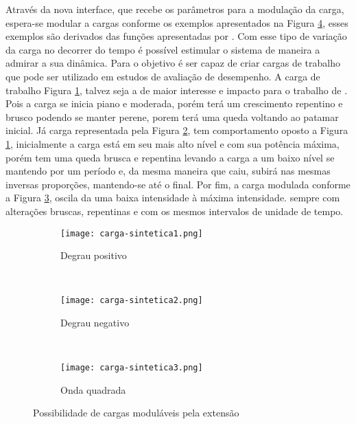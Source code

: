 Através da nova interface, que recebe os parâmetros para a modulação da carga, espera-se modular a cargas conforme os exemplos apresentados na Figura	\ref{fig:cargas-moduladas-exemplos}, esses exemplos são derivados das funções apresentadas por . Com esse tipo de variação da carga no decorrer do tempo é possível estimular o sistema de maneira a admirar a sua dinâmica.  Para  o objetivo é ser capaz de criar cargas de trabalho que pode ser utilizado em estudos de avaliação de desempenho. 
A carga de trabalho Figura \ref{fig:degrau-positivo}, talvez seja a de maior interesse e impacto para o trabalho de . Pois a carga se inicia piano e moderada, porém terá um crescimento repentino e brusco podendo se manter perene, porem terá uma queda voltando ao patamar inicial. Já carga representada pela Figura \ref{fig:degrau-negativo}, tem comportamento oposto a Figura \ref{fig:degrau-positivo}, inicialmente a carga está em seu mais alto nível e com sua potência máxima, porém tem uma queda brusca e repentina levando a carga a um baixo nível se mantendo por um período e, da mesma maneira que caiu, subirá nas mesmas inversas proporções, mantendo-se até o final. Por fim, a carga modulada conforme a Figura \ref{fig:onda-gradrada}, oscila da uma baixa intensidade à máxima intensidade. sempre com alterações bruscas, repentinas e com os mesmos intervalos de unidade de tempo.
 
\begin{figure}[!htb]
	\centering
	\begin{subfigure}[b]{0.45\textwidth}
		\texttt{[image: carga-sintetica1.png]}
		\caption{Degrau positivo}
		\label{fig:degrau-positivo}
	\end{subfigure}
	~
	\begin{subfigure}[b]{0.45\textwidth}
		\texttt{[image: carga-sintetica2.png]}
		\caption{Degrau negativo}
		\label{fig:degrau-negativo}
	\end{subfigure}
	~
	\begin{subfigure}[b]{0.45\textwidth}
		\texttt{[image: carga-sintetica3.png]}
		\caption{Onda quadrada}
		\label{fig:onda-gradrada}
	\end{subfigure}
	\caption{Possibilidade de cargas moduláveis pela extensão}
	\label{fig:cargas-moduladas-exemplos}
\end{figure}


